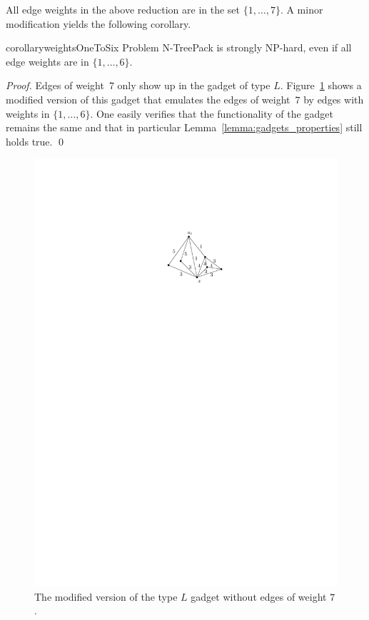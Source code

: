 \documentclass[runningheads]{llncs}
\newcommand{\set}[1]{\{ #1 \}}
\newcommand{\fromto}[2]{\set{#1, \ldots, #2}}
\newcommand{\xxxNTP}{{\sc N-TreePack}}
\begin{document}
All edge weights in the above reduction are in the set $\fromto{1}{7}$.
A minor modification yields the following corollary.
\begin{restatable}{corollary}{weightsOneToSix}
\label{coro:small-weights}
Problem {\xxxNTP} is strongly NP-hard, even if all edge weights are in $\fromto{1}{6}$.
\end{restatable}
\begin{proof}
Edges of weight~$7$ only show up in the gadget of type $L$.
Figure~\ref{fig_hamilton_cycle_improved} shows a modified version of this gadget that emulates 
the edges of weight~$7$ by edges with weights in $\fromto{1}{6}$.
One easily verifies that the functionality of the gadget remains the same and that in particular
Lemma~\ref{lemma:gadgets_properties} still holds true.
\qed
\end{proof}
\begin{figure}[htpb]
\centering
\includegraphics[scale=1.1]{act-hamilton-cycle-b}
\caption{The modified version of the type $L$ gadget without edges of weight $7$.}
\label{fig_hamilton_cycle_improved}
\end{figure}
\end{document}
